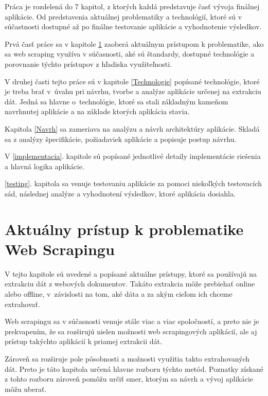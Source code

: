 \newpage

Práca je rozdelená do 7 kapitol, z ktorých každá predstavuje časť vývoja finálnej aplikácie. Od predstavenia aktuálnej problematiky a technológií, ktoré sú v súčastnosti dostupné až po finálne testovanie aplikácie a vyhodnotenie výsledkov.

\bigskip

Prvá časť práce sa v kapitole \ref{aktualny_pristup} zaoberá aktuálnym prístupom k problematike, ako sa web scraping využíva v súčasnosti, aké sú štandardy, dostupné technológie a porovnanie týchto prístupov z hľadiska využiteľnosti.

V druhej časti tejto práce sú v kapitole \ref{Technologie} popísané technológie, ktoré je treba brať \mbox{v úvahu} pri návrhu, tvorbe a analýze aplikácie určenej na extrakciu dát. Jedná sa hlavne o~technológie, ktoré sa stali základným kameňom navrhnutej aplikácie a na základe ktorých aplikácia stavia.

Kapitola \ref{Navrh} sa zameriava na analýzu a návrh architektúry aplikácie. Skladá sa z analýzy špecifikácie, požiadaviek aplikácie a popisuje postup návrhu.

V \ref{implementacia}. kapitole sú popísané jednotlivé detaily implementácie riešenia a hlavná logika aplikácie.

\ref{testing}. kapitola sa venuje testovaniu aplikácie za pomoci niekoľkých testovacích sád, následnej analýze a vyhodnotení výsledkov, ktoré aplikácia dosiahla.


\chapter{Aktuálny prístup k problematike Web Scrapingu}
\label{aktualny_pristup}

V tejto kapitole sú uvedené a popísané aktuálne prístupy, ktoré sa používajú na extrakciu dát z webových dokumentov. Takáto extrakcia môže prebiehať online alebo offline, v~závislosti na tom, aké dáta a za akým cieľom ich chceme extrahovať.

Web scrapingu sa v súčasnosti venuje stále viac a viac spoločností, a preto nie je prekvapením, že sa rozširujú nielen možnosti web scrapingových aplikácií, ale aj prístup takýchto aplikácií k priamej extrakcii dát.

Zároveň sa rozširuje pole pôsobnosti a možnosti využitia takto extrahovaných dát. Preto je táto kapitola určená hlavne rozboru týchto metód. Poznatky získané z tohto rozboru zároveň pomôžu určiť smer, ktorým sa návrh a vývoj aplikácie môžu uberať. 

